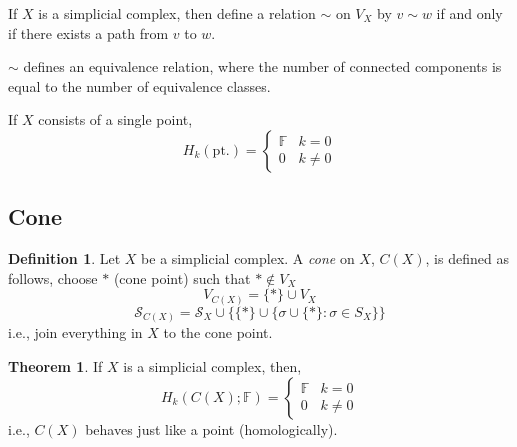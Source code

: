 \documentclass[a4paper,14pt]{extarticle}
\theoremstyle{definition}
\newtheorem*{theorem}{Theorem}
\newtheorem*{definition}{Definition}
\begin{document}
If $X$ is a simplicial complex, then define a relation $\sim$ on $V_X$ by $v\sim w$ if and
only if there exists a path from $v$ to $w$.

\vspace{12pt}

$\sim$ defines an equivalence relation, where the number of connected components is equal
to the number of equivalence classes.

If $X$ consists of a single point,
\[H_k(\text{pt.})=\begin{cases}\mathbb{F}&k=0\\0&k\neq0\end{cases}\]

\subsection{Cone}
\begin{definition}
	Let $X$ be a simplicial complex. A \emph{cone} on $X$, $C(X)$, is defined as follows,
	choose $*$ (cone point) such that $*\not\in V_X$
	\[V_{C(X)}=\{*\}\cup V_X\] \[\mathcal{S}_{C(X)}=
	\mathcal{S}_X\cup\{\{*\}\cup\{\sigma\cup\{*\}:\sigma\in S_X\}\}\]
	i.e., join everything in $X$ to the cone point.
\end{definition}

\begin{theorem}
	If $X$ is a simplicial complex, then,
	\[H_k(C(X);\mathbb{F})=\begin{cases}\mathbb{F}&k=0\\0&k\neq0\end{cases}\]
	i.e., $C(X)$ behaves just like a point (homologically).
\end{theorem}
\end{document}
